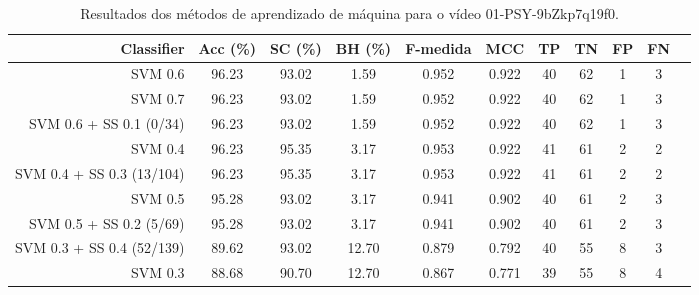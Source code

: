\begin{table}[!htb]
\centering
\caption{Resultados dos métodos de aprendizado de máquina para o vídeo 01-PSY-9bZkp7q19f0.}
\label{tab:01-PSY-9bZkp7q19f0}
\begin{tabular}{r|c|c|c|c|c|c|c|c|c|c}
\hline\hline
Classifier & Acc (\%) & SC (\%) & BH (\%) & F-medida & MCC & TP & TN & FP & FN \\ \hline
SVM 0.6 & 96.23 & 93.02 & 1.59 & 0.952 & 0.922 & 40 & 62 & 1 & 3 \\ 
SVM 0.7 & 96.23 & 93.02 & 1.59 & 0.952 & 0.922 & 40 & 62 & 1 & 3 \\ 
SVM 0.6 + SS 0.1 (0/34) & 96.23 & 93.02 & 1.59 & 0.952 & 0.922 & 40 & 62 & 1 & 3 \\ 
SVM 0.4 & 96.23 & 95.35 & 3.17 & 0.953 & 0.922 & 41 & 61 & 2 & 2 \\ 
SVM 0.4 + SS 0.3 (13/104) & 96.23 & 95.35 & 3.17 & 0.953 & 0.922 & 41 & 61 & 2 & 2 \\ 
SVM 0.5 & 95.28 & 93.02 & 3.17 & 0.941 & 0.902 & 40 & 61 & 2 & 3 \\ 
SVM 0.5 + SS 0.2 (5/69) & 95.28 & 93.02 & 3.17 & 0.941 & 0.902 & 40 & 61 & 2 & 3 \\ 
SVM 0.3 + SS 0.4 (52/139) & 89.62 & 93.02 & 12.70 & 0.879 & 0.792 & 40 & 55 & 8 & 3 \\ 
SVM 0.3 & 88.68 & 90.70 & 12.70 & 0.867 & 0.771 & 39 & 55 & 8 & 4 \\ 
\hline\hline
\end{tabular}
\end{table}

